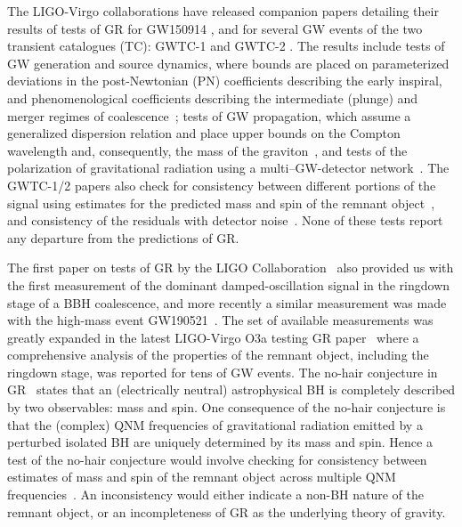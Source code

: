 \documentclass[twocolumn,prd,aps,superscriptaddress,preprintnumbers,tightenlines,showpacs,nofootinbib,eqsecnum,amsfonts,amsmath]{revtex4-1}
\begin{document}
The LIGO-Virgo collaborations have released companion papers detailing their results
of tests of GR for GW150914 \cite{TheLIGOScientific:2016src}, and for several GW events of
the two transient catalogues (TC): GWTC-1 \cite{LIGOScientific:2018mvr,LIGOScientific:2019fpa}  and GWTC-2 \cite{Abbott:2020niy,Abbott:2020jks}.
The results include tests of GW generation and source dynamics, where bounds are placed on
parameterized deviations in the post-Newtonian (PN) coefficients describing
the early inspiral, and
phenomenological coefficients describing the intermediate (plunge) and
merger regimes of coalescence~\cite{Arun:2006hn,Arun:2006yw,Agathos:2013upa,Abbott:2018lct}; tests of GW
propagation, which assume a generalized dispersion relation and place
upper bounds on the Compton wavelength and, consequently, the mass of
the graviton~\cite{Abbott:2017vtc,Samajdar:2017mka}, and tests of the
polarization of gravitational radiation using a
multi--GW-detector network~\cite{Abbott:2017oio,Isi:2017fbj}. The GWTC-1/2 papers also
check for consistency between different portions of the signal using estimates for the predicted mass and spin of the remnant
object~\cite{Ghosh:2016xx,Ghosh:2017gfp,TheLIGOScientific:2016src}, and
consistency of the residuals with detector noise~\cite{Ghonge:2020suv,LIGOScientific:2019fpa}. None of these tests report any
departure from the predictions of GR.

The first paper on tests of GR by the LIGO Collaboration~\cite{TheLIGOScientific:2016src} also provided us with the first measurement of the dominant damped-oscillation signal in the ringdown stage of a BBH
coalescence, and more recently a similar measurement was made with the high-mass event GW190521~\cite{Abbott:2020tfl,Abbott:2020mjq}. The set of available measurements was greatly expanded in the latest LIGO-Virgo O3a testing GR paper~\cite{Abbott:2020jks} where a comprehensive analysis of the properties of the remnant object, including the ringdown stage, was reported for tens of GW events. The no-hair conjecture in GR~\cite{Israel:1967wq,Hawking:1971vc,Carter:1971zc,Robinson:1975bv,Mazur:1982db} states that an (electrically neutral) astrophysical BH is completely described by two observables: mass and spin. One
consequence of the no-hair conjecture is that the (complex) QNM
frequencies of gravitational radiation emitted by a perturbed isolated
BH are uniquely determined by its mass and spin. Hence
a test of the no-hair conjecture would involve checking for
consistency between estimates of mass and spin of the remnant object
across multiple QNM frequencies~\cite{Dreyer:2003bv,Berti:2005ys}. An inconsistency would either
indicate a non-BH nature of the remnant object, or an incompleteness
of GR as the underlying theory of gravity.
\end{document}
